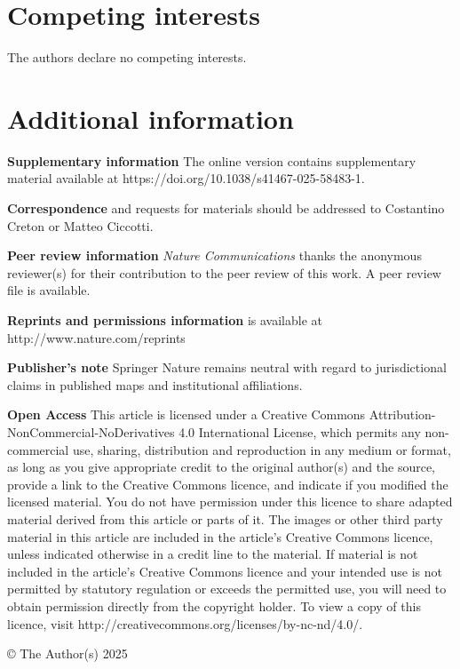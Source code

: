 \documentclass{article}
\begin{document}
\section*{Competing interests}

The authors declare no competing interests.

\section*{Additional information}

\noindent\textbf{Supplementary information} The online version contains supplementary material available at https://doi.org/10.1038/s41467-025-58483-1.

\noindent\textbf{Correspondence} and requests for materials should be addressed to Costantino Creton or Matteo Ciccotti.

\noindent\textbf{Peer review information} \emph{Nature Communications} thanks the anonymous reviewer(s) for their contribution to the peer review of this work. A peer review file is available.

\noindent\textbf{Reprints and permissions information} is available at http://www.nature.com/reprints

\noindent\textbf{Publisher’s note} Springer Nature remains neutral with regard to jurisdictional claims in published maps and institutional affiliations.

\noindent\textbf{Open Access} This article is licensed under a Creative Commons Attribution-NonCommercial-NoDerivatives 4.0 International License, which permits any non-commercial use, sharing, distribution and reproduction in any medium or format, as long as you give appropriate credit to the original author(s) and the source, provide a link to the Creative Commons licence, and indicate if you modified the licensed material. You do not have permission under this licence to share adapted material derived from this article or parts of it. The images or other third party material in this article are included in the article’s Creative Commons licence, unless indicated otherwise in a credit line to the material. If material is not included in the article’s Creative Commons licence and your intended use is not permitted by statutory regulation or exceeds the permitted use, you will need to obtain permission directly from the copyright holder. To view a copy of this licence, visit http://creativecommons.org/licenses/by-nc-nd/4.0/.

\noindent © The Author(s) 2025
\end{document}
